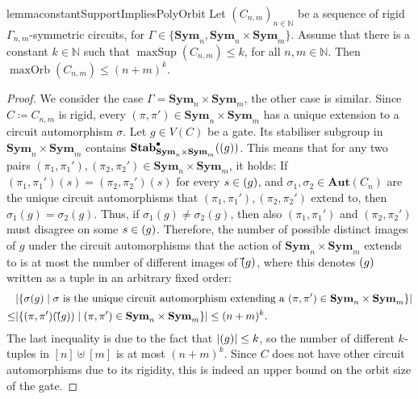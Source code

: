 \documentclass[11pt, DIV=15]{scrarticle}
\theoremstyle{definition}
\theoremstyle{plain}
\theoremstyle{remark}
\newcommand{\Aut}{\mathbf{Aut}}
\newcommand{\Sym}{\mathbf{Sym}}
\newcommand{\Stab}{\mathbf{Stab}}
\newcommand{\StabP}{\Stab^{\bullet}}
\newcommand{\bbN}{\mathbb{N}}
\let\sup\relax
\DeclareMathOperator{\sup}{sup}
\DeclareMathOperator{\maxOrb}{maxOrb}
\DeclareMathOperator{\maxSup}{maxSup}
\begin{document}
\begin{restatable}{lemma}{constantSupportImpliesPolyOrbit}\label{lem:constantSupportImpliesPolyOrbit}
	Let $(C_{n,m})_{n \in \bbN}$ be a sequence of rigid $\Gamma_{n,m}$-symmetric circuits, for $\Gamma \in \{\Sym_n, \Sym_n \times \Sym_m\}$. Assume that there is a constant $k \in \bbN$ such that $\maxSup(C_{n,m}) \leq k$, for all $n,m \in \bbN$.
	Then $\maxOrb(C_{n,m}) \leq (n+m)^k$.
\end{restatable}
\begin{proof}		
	We consider the case $\Gamma = \Sym_n \times \Sym_m$, the other case is similar.
	Since $C \coloneqq C_{n,m}$ is rigid, every $(\pi, \pi') \in \Sym_n \times \Sym_m$ has a unique extension to a circuit automorphism $\sigma$. 
	Let $g \in V(C)$ be a gate. Its stabiliser subgroup in $\Sym_n \times \Sym_m$ contains $\StabP
	_{\Sym_n \times \Sym_m}(\sup(g))$. 
	This means that for any two pairs $(\pi_1, \pi_1'), (\pi_2, \pi_2') \in \Sym_n \times \Sym_m$, it holds: If $(\pi_1, \pi_1')(s) = (\pi_2, \pi_2')(s)$ for every $s \in \sup(g)$, and $\sigma_1, \sigma_2 \in \Aut(C_n)$ are the unique circuit automorphisms that $(\pi_1, \pi_1'), (\pi_2, \pi_2')$ extend to, then $\sigma_1(g) = \sigma_2(g)$. Thus, if $\sigma_1(g) \neq \sigma_2(g)$, then also $(\pi_1, \pi_1')$ and $(\pi_2, \pi_2')$ must disagree on some $s \in \sup(g)$. 
	Therefore, the number of possible distinct images of $g$ under the circuit automorphisms that the action of $\Sym_n \times \Sym_m$ extends to is at most the number of different images of $\vec{\sup}(g)$, where this denotes $\sup(g)$ written as a tuple in an arbitrary fixed order:
	\begin{align*}
		&|\{ \sigma(g) \mid \sigma \text{ is the unique circuit automorphism extending a } (\pi, \pi') \in \Sym_n \times \Sym_m   \}|\\
		\leq
		&|\{ (\pi, \pi')(\vec{\sup}(g)) \mid (\pi, \pi') \in \Sym_n \times \Sym_m   \}| \leq (n+m)^k.
	\end{align*}
	The last inequality is due to the fact that $|\sup(g)| \leq k$, so the number of different $k$-tuples in $[n] \uplus [m]$ is at most $(n+m)^k$.
	Since $C$ does not have other circuit automorphisms due to its rigidity, this is indeed an upper bound on the orbit size of the gate.
\end{proof}
\end{document}
